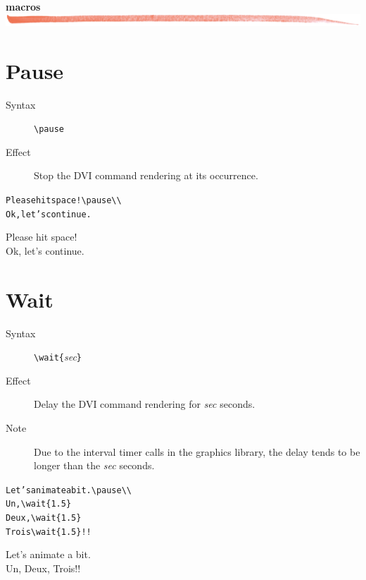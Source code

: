 \documentclass{article}
\begin{document}
\noindent
{\bf\Large {\ActiveDVI} macros}\\

\noindent
\includegraphics[width=\textwidth]{../tex/bar.jpg.eps}

\section{Pause}

\begin{description}
\item[Syntax]  \verb!\pause!
\item[Effect] Stop the DVI command rendering at its occurrence.
\end{description}

\begin{minipage}[t]{0.5\textwidth}
\begin{alltt}
Please hit space!{\color{blue}\verb!\!pause}\verb!\\!
Ok, let's continue.
\end{alltt}
\end{minipage}
\begin{minipage}[t]{0.5\textwidth}
Please hit space!\\ \pause Ok, let's continue.
\end{minipage}

\section{Wait}

\begin{description}
\item[Syntax]  \verb!\wait{!{\em{sec}}\verb!}!
\item[Effect] Delay the DVI command rendering for {\em{sec}} seconds.
\item[Note] Due to the interval timer calls in the graphics library,
  the delay tends to be longer than the {\em{sec}} seconds.
\end{description}

\begin{minipage}[t]{0.5\textwidth}
\begin{alltt}
Let's animate a bit.\verb!\pause\\!
Un,{\color{blue}\verb!\wait{1.5}!}
Deux,{\color{blue}\verb!\wait{1.5}!}
Trois{\color{blue}\verb!\wait{1.5}!}!! 
\end{alltt}
\end{minipage}
\begin{minipage}[t]{0.5\textwidth}
Let's animate a bit.\pause\\
Un,
Deux,
Trois!! 
\end{minipage}
\end{document}
